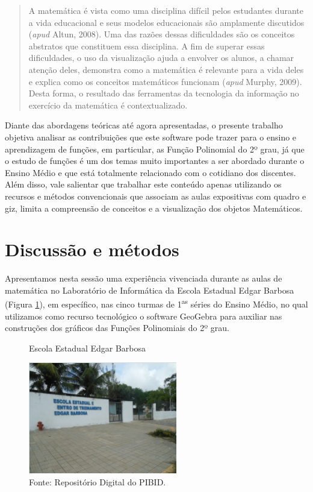\begin{refsection}
    \begin{quotation}
        A matemática é vista como uma disciplina difícil pelos estudantes durante a vida educacional e seus modelos educacionais são amplamente discutidos (\textit{apud} Altun, 2008). Uma das razões dessas dificuldades são os conceitos abstratos que constituem essa disciplina. A fim de superar essas dificuldades, o uso da visualização ajuda a envolver os alunos, a chamar atenção deles, demonstra como a matemática é relevante para a vida deles e explica como os conceitos matemáticos funcionam (\textit{apud} Murphy, 2009). Desta forma, o resultado das ferramentas da tecnologia da informação no exercício da matemática é contextualizado. 
    \end{quotation}

    Diante das abordagens teóricas até agora apresentadas, o presente trabalho objetiva analisar as contribuições que este software pode trazer para o ensino e aprendizagem de funções, em particular, as Função Polinomial do 2º grau, já que o estudo de funções é um dos temas muito importantes a ser abordado durante o Ensino Médio e que está totalmente relacionado com o cotidiano dos discentes. Além disso, vale salientar que trabalhar este conteúdo apenas utilizando os recursos e métodos convencionais que associam as aulas expositivas com quadro e giz, limita a compreensão de conceitos e a visualização dos objetos Matemáticos. 

    \section{Discussão e métodos}

    Apresentamos nesta sessão uma experiência vivenciada durante as aulas de matemática no Laboratório de Informática da Escola Estadual Edgar Barbosa (Figura \ref{fig:ee-edgar-b}), em específico, nas cinco turmas de 1\textsuperscript{as} séries do Ensino Médio, no qual utilizamos como recurso tecnológico o software GeoGebra para auxiliar nas construções dos gráficos das Funções Polinomiais do 2º grau.

    \begin{figure}[ht]%
        \centering%
        \caption{Escola Estadual Edgar Barbosa}%
        \includegraphics[width=.50\textwidth]{articles/03-contribuicoes-do-sof/image2.png}%
        \caption*{Fonte: Repositório Digital do PIBID.}%
        \label{fig:ee-edgar-b}%
    \end{figure}%


\end{refsection}
